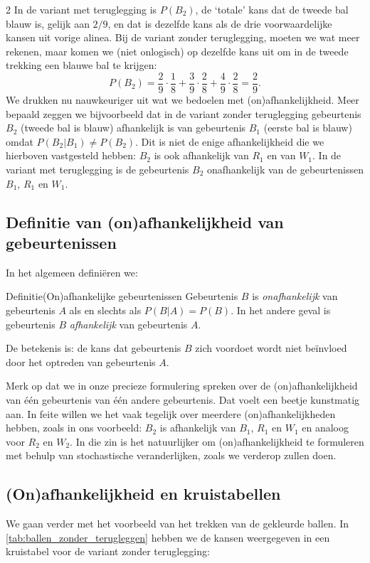 \begin{multicols} {2}
In de variant met teruglegging is $P(B_2)$, de ‘totale’ kans dat de tweede bal blauw is, gelijk aan $2/9$, en dat is dezelfde kans als de drie voorwaardelijke kansen uit vorige alinea. Bij de variant zonder teruglegging, moeten we wat meer rekenen, maar komen we (niet onlogisch) op dezelfde kans uit om in de tweede trekking een blauwe bal te krijgen:
$$P(B_2)=\frac{2}{9} \cdot \frac{1}{8} + \frac{3}{9} \cdot \frac{2}{8} + \frac{4}{9} \cdot \frac{2}{8} = \frac{2}{9}.$$
We drukken nu nauwkeuriger uit wat we bedoelen met (on)afhankelijkheid. Meer bepaald zeggen we bijvoorbeeld dat in de variant zonder teruglegging gebeurtenis $B_2$ (tweede bal is blauw) afhankelijk is van gebeurtenis $B_1$ (eerste bal is blauw) omdat $P(B_2|B_1) \neq P(B_2)$. Dit is niet de enige afhankelijkheid die we hierboven vastgesteld hebben: $B_2$ is ook afhankelijk van $R_1$ en van $W_1$. In de variant met teruglegging is de gebeurtenis $B_2$ onafhankelijk van de gebeurtenissen $B_1$, $R_1$ en $W_1$.

\subsection*{Definitie van (on)afhankelijkheid van gebeurtenissen}
In het algemeen definiëren we: 

\begin{kader}{Definitie}{(On)afhankelijke gebeurtenissen}
Gebeurtenis $B$ is \emph{onafhankelijk} van gebeurtenis $A$ als en slechts als $P(B|A)=P(B)$. In het andere geval is gebeurtenis $B$ \emph{afhankelijk} van gebeurtenis $A$.
\end{kader}

De betekenis is: de kans dat gebeurtenis $B$ zich voordoet wordt niet beïnvloed door het optreden van gebeurtenis $A$.

Merk op dat we in onze precieze formulering spreken over de (on)afhankelijkheid van één gebeurtenis van één andere gebeurtenis. Dat voelt een beetje kunstmatig aan. In feite willen we het vaak tegelijk over meerdere (on)afhankelijkheden hebben, zoals in ons voorbeeld: $B_2$ is afhankelijk van $B_1$, $R_1$ en $W_1$ en analoog voor $R_2$ en $W_2$. In die zin is het natuurlijker om (on)afhankelijkheid te formuleren met behulp van stochastische veranderlijken, zoals we verderop zullen doen.

\subsection*{(On)afhankelijkheid en kruistabellen}

We gaan verder met het voorbeeld van het trekken van de gekleurde ballen. In \autoref{tab:ballen_zonder_terugleggen} hebben we de kansen weergegeven in een kruistabel voor de variant zonder teruglegging:

\end{multicols}

